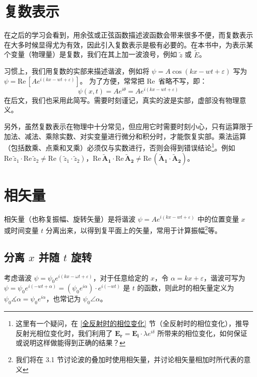 \documentclass[UTF8]{report}
\def\Re{\mathrm{Re}\,}
\theoremstyle{MyLineTheoremStyle} %
\theoremstyle{MyBlockTheoremStyle} %
\theoremstyle{MySubsubsectionStyle} %
\begin{document}
\section{复数表示}
在之后的学习会看到，用余弦或正弦函数描述波函数会带来很多不便，而复数表示在大多时候显得尤为有效，因此引入复数表示是极有必要的。在本书中，为表示某个变量（物理量）是复数，我们在其上加一波浪号，例如 $\tilde{z}$ 或 $\tilde{E}$。

习惯上，我们用复数的实部来描述谐波，例如将 $\psi = A \cos(kx - wt + \varepsilon)$ 写为 $\psi = \Re [A e^{i (kx - wt + \varepsilon)}]$。
为了方便，常常把 $\Re$ 省略不写，即：
\begin{equation}
    \psi(x,t) = A e^{i \theta} = A e^{i (kx - wt + \varepsilon)}
\end{equation}
在后文，我们也采用此简写。需要时刻谨记，真实的波是实部，虚部没有物理意义。

另外，虽然复数表示在物理中十分常见，但应用它时需要时刻小心，只有运算限于加法、减法、乘除实数、对实变量进行微分和积分时，才能恢复实部。乘法运算（包括数乘、点乘和叉乘）必须仅与实数进行，否则会得到错误结论\footnote{这里有一个疑问，在 \ref{全反射时的相位变化} 节（全反射时的相位变化），推导反射光相位变化时，我们利用了 $\boldsymbol{E_r} = \boldsymbol{E_i}\cdot \lambda e^{i \delta} $ 所带来的相位变化，如何保证或说明这样做能得到正确的结果？}。例如 $\Re \tilde{z}_1 \cdot \Re \tilde{z}_2 \ne \Re (\tilde{z}_1\cdot \tilde{z}_2)$，$\Re \boldsymbol{\tilde{A}_1 }\cdot \Re \boldsymbol{\tilde{A}_2 }\ne \Re (\boldsymbol{\tilde{A}_1} \cdot \boldsymbol{\tilde{A}_2})$。

\section{相矢量}\label{相矢量}

相矢量（也称复振幅、旋转矢量）是将谐波 $\psi = A e^{i (kx - wt + \varepsilon)}$ 中的位置变量 $x$ 或时间变量 $t$ 分离出来，以得到复平面上的矢量，常用于计算振幅\footnote{我们将在 3.1 节讨论波的叠加时使用相矢量，并讨论相矢量相加时所代表的意义}等。

\subsection{分离 $x$ 并随 $t$ 旋转}

考虑谐波 $\psi = \psi_0 e^{i(kx - \omega t + \varepsilon)}$，对于任意给定的 $x$，令 $\alpha = kx + \varepsilon$，谐波可写为 $\psi = \psi_0 e^{i(- wt + \alpha)} = (\psi_0 e^{i \alpha})\cdot e^{i(- wt)} $ 是 $t$ 的函数，则此时的相矢量定义为 $ \psi_0 \measuredangle \alpha = \psi_0 e^{i \alpha}$，也常记为 $\psi_0 \angle \alpha$。
\end{document}
